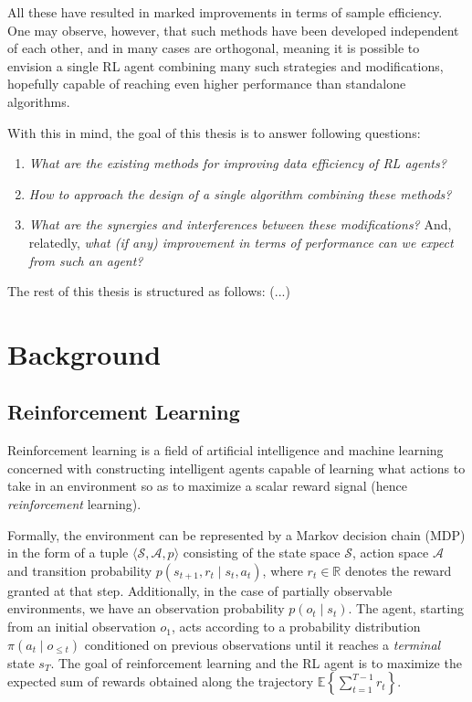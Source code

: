 \documentclass[twoside,11pt]{article}
\begin{document}
All these have resulted in marked improvements in terms of sample efficiency. One may observe, however, that such methods have been developed independent of each other, and in many cases are orthogonal, meaning it is possible to envision a single RL agent combining many such strategies and modifications, hopefully capable of reaching even higher performance than standalone algorithms.

With this in mind, the goal of this thesis is to answer following questions:

\begin{enumerate}
    \item \emph{What are the existing methods for improving data efficiency of RL agents?}
    \item \emph{How to approach the design of a single algorithm combining these methods?}
    \item \emph{What are the synergies and interferences between these modifications?} And, relatedly, \emph{what (if any) improvement in terms of performance can we expect from such an agent?}
\end{enumerate}

The rest of this thesis is structured as follows: (...)

\section{Background}

\subsection{Reinforcement Learning}

Reinforcement learning is a field of artificial intelligence and machine learning concerned with constructing intelligent agents capable of learning what actions to take in an environment so as to maximize a scalar reward signal (hence \emph{reinforcement} learning).

Formally, the environment can be represented by a Markov decision chain (MDP) in the form of a tuple $\langle \mathcal{S}, \mathcal{A}, p \rangle$ consisting of the state space $\mathcal{S}$, action space $\mathcal{A}$ and transition probability $p(s_{t+1}, r_{t} \mid s_t, a_t)$, where $r_t \in \mathbb{R}$ denotes the reward granted at that step. Additionally, in the case of partially observable environments, we have an observation probability $p(o_t \mid s_t)$. The agent, starting from an initial observation $o_1$, acts according to a probability distribution $\pi(a_t \mid o_{\leq t})$ conditioned on previous observations until it reaches a \emph{terminal} state $s_T$. The goal of reinforcement learning and the RL agent is to maximize the expected sum of rewards obtained along the trajectory $\mathbb{E} \left\{\sum_{t=1}^{T-1} r_t\right\}$.
\end{document}
